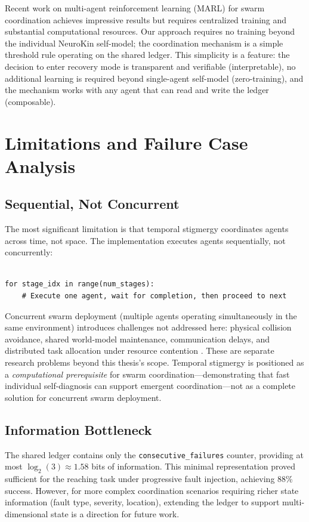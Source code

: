 \documentclass[12pt,a4paper,oneside]{report}
\begin{document}
Recent work on multi-agent reinforcement learning (MARL) for swarm coordination \cite{domberg2026selfadapting, daneshmand2026slowrl} achieves impressive results but requires centralized training and substantial computational resources. Our approach requires no training beyond the individual NeuroKin self-model; the coordination mechanism is a simple threshold rule operating on the shared ledger. This simplicity is a feature: the decision to enter recovery mode is transparent and verifiable (interpretable), no additional learning is required beyond single-agent self-model (zero-training), and the mechanism works with any agent that can read and write the ledger (composable).
\section{Limitations and Failure Case Analysis}
\subsection{Sequential, Not Concurrent}
\label{subsec:sequential_not_concurrent}

The most significant limitation is that temporal stigmergy coordinates agents across time, not space. The implementation executes agents sequentially, not concurrently:
\begin{verbatim}

for stage_idx in range(num_stages):
    # Execute one agent, wait for completion, then proceed to next

\end{verbatim}

Concurrent swarm deployment (multiple agents operating simultaneously in the same environment) introduces challenges not addressed here: physical collision avoidance, shared world-model maintenance, communication delays, and distributed task allocation under resource contention \cite{matsuki2024gaussian, keetha2024splattam}. These are separate research problems beyond this thesis's scope. Temporal stigmergy is positioned as a \textit{computational prerequisite} for swarm coordination---demonstrating that fast individual self-diagnosis can support emergent coordination---not as a complete solution for concurrent swarm deployment.
\subsection{Information Bottleneck}
\label{subsec:information_bottleneck}

The shared ledger contains only the \texttt{consecutive\_failures} counter, providing at most $\log_2(3) \approx 1.58$ bits of information. This minimal representation proved sufficient for the reaching task under progressive fault injection, achieving 88\% success. However, for more complex coordination scenarios requiring richer state information (fault type, severity, location), extending the ledger to support multi-dimensional state is a direction for future work.
\end{document}
